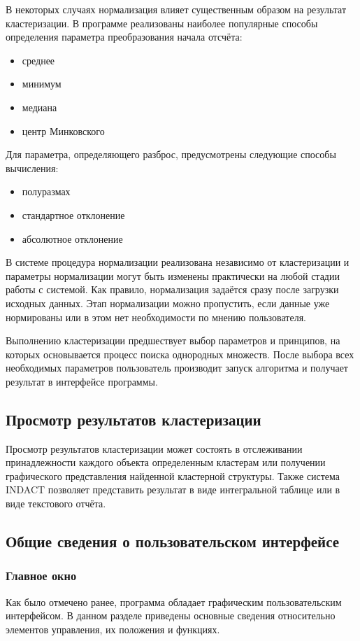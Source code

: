 \documentclass[12pt,tikz]{instruction}
\begin{document}
В некоторых случаях нормализация влияет существенным образом на результат кластеризации. 
В программе \SysName реализованы наиболее популярные способы определения параметра преобразования начала отсчёта:
\begin{itemize}
	\item среднее
	\item минимум
	\item медиана
	\item центр Минковского
\end{itemize}

Для параметра, определяющего разброс, предусмотрены следующие способы вычисления:
\begin{itemize}
	\item полуразмах
	\item стандартное отклонение
	\item абсолютное отклонение
\end{itemize}
 
В системе \SysName процедура нормализации реализована независимо от кластеризации и параметры нормализации могут быть изменены практически на любой стадии работы с системой. Как правило, нормализация задаётся сразу после загрузки исходных данных. Этап нормализации можно пропустить, если данные уже нормированы или в этом нет необходимости по мнению пользователя.

Выполнению кластеризации предшествует выбор параметров и принципов, на которых основывается процесс поиска однородных множеств. После выбора всех необходимых параметров пользователь производит запуск алгоритма и получает результат в интерфейсе программы. 

\subsection{Просмотр результатов кластеризации}

Просмотр результатов кластеризации может состоять в отслеживании принадлежности каждого объекта определенным кластерам или получении графического представления найденной кластерной структуры. Также система INDACT позволяет представить результат в виде интегральной таблице или в виде текстового отчёта.


\subsection{Общие сведения о пользовательском интерфейсе}

\subsubsection{Главное окно}
\label{subsec:gui}
Как было отмечено ранее, программа обладает графическим пользовательским интерфейсом. В данном разделе приведены основные сведения относительно элементов управления, их положения и функциях.
\end{document}

